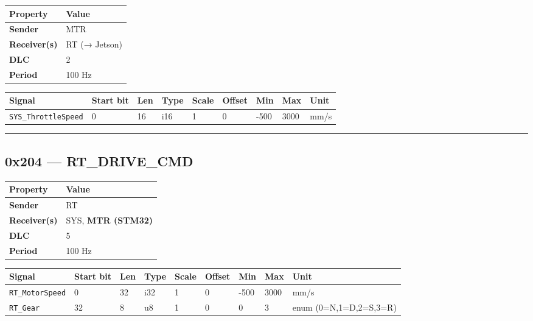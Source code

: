 \documentclass[12pt,a4paper,oneside]{report}
\begin{document}
\begin{longtable}[]{@{}ll@{}}
\toprule\noalign{}
Property & Value \\
\midrule\noalign{}
\endhead
\bottomrule\noalign{}
\endlastfoot
\textbf{Sender} & MTR \\
\textbf{Receiver(s)} & RT (→ Jetson) \\
\textbf{DLC} & 2 \\
\textbf{Period} & 100 Hz \\
\end{longtable}

\begin{longtable}[]{@{}lllllllll@{}}
\toprule\noalign{}
Signal & Start bit & Len & Type & Scale & Offset & Min & Max & Unit \\
\midrule\noalign{}
\endhead
\bottomrule\noalign{}
\endlastfoot
\texttt{SYS\_ThrottleSpeed} & 0 & 16 & i16 & 1 & 0 & -500 & 3000 & mm/s \\
\end{longtable}

\begin{center}\rule{0.5\linewidth}{0.5pt}\end{center}

\subsection{0x204 --- RT\_DRIVE\_CMD}\label{x204-rt_drive_cmd}

\begin{longtable}[]{@{}ll@{}}
\toprule\noalign{}
Property & Value \\
\midrule\noalign{}
\endhead
\bottomrule\noalign{}
\endlastfoot
\textbf{Sender} & RT \\
\textbf{Receiver(s)} & SYS, \textbf{MTR (STM32)} \\
\textbf{DLC} & 5 \\
\textbf{Period} & 100 Hz \\
\end{longtable}

\begin{longtable}[]{@{}lllllllll@{}}
\toprule\noalign{}
Signal & Start bit & Len & Type & Scale & Offset & Min & Max & Unit \\
\midrule\noalign{}
\endhead
\bottomrule\noalign{}
\endlastfoot
\texttt{RT\_MotorSpeed} & 0 & 32 & i32 & 1 & 0 & -500 & 3000 & mm/s \\
\texttt{RT\_Gear} & 32 & 8 & u8 & 1 & 0 & 0 & 3 & enum (0=N,1=D,2=S,3=R) \\
\end{longtable}
\end{document}
